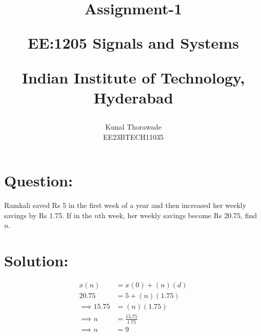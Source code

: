 \documentclass[journal,12pt,twocolumn]{IEEEtran}
\theoremstyle{remark}
\begin{document}
%




\vspace{3cm}

\title{
	Assignment-1 

	\large{EE:1205 Signals and Systems}

	Indian Institute of Technology, Hyderabad
}
\author{Kunal Thorawade

EE23BTECH11035
}	

\maketitle


\newpage


\bigskip
 
 \renewcommand{\thefigure}{\theenumi}
 \renewcommand{\thetable}{\theenumi}
 \begin{flushleft}

	 \section{\Large Question:}  Ramkali saved Rs 5 in the first week of a year and then increased her weekly savings by Rs 1.75. If in the $n$th week, her weekly savings become Rs 20.75, find $n$.

	 \section{\Large Solution:} 
	 

 \end{flushleft}
 \begin{center}

	 \begin{align} 
		 x(n) &= x(0) + (n)(d)
		 \\ 20.75 &= 5 + (n)(1.75)  
		 \\ \implies 15.75 &= (n)(1.75)
		 \\ \implies n &= \frac{15.75}{1.75}
		 \\ \implies n &= 9
	 \end{align}
 \end{center}
\end{document}
